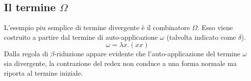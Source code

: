 \subsection{Il termine \texorpdfstring{$\Omega$}{Omega}}
L'esempio piu semplice di termine divergente è il combinatore $\Omega$. Esso viene costruito a partire dal termine di auto-applicazione $\omega$ 
(talvolta indicato come $\delta$).
\begin{equation}
    \omega = \lambda x. (x x)
\end{equation}
Dalla regola di $\beta$-riduzione appare evidente che l'auto-applicazione del termine $\omega$ sia divergente, la contrazione del redex non conduce a una forma 
normale ma riporta al termine iniziale.